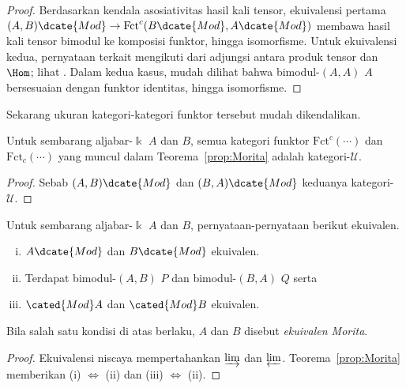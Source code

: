\begin{proof}
Berdasarkan kendala asosiativitas hasil kali tensor, ekuivalensi pertama
	$(A,B)\dcate{Mod}\to\mathrm{Fct}^c(B\dcate{Mod},A\dcate{Mod})$ membawa
hasil kali tensor bimodul ke komposisi funktor, hingga isomorfisme. Untuk
	ekuivalensi kedua, pernyataan terkait mengikuti dari adjungsi antara produk
	tensor dan $\Hom$; lihat \cite[Teorema 6.6.5]{Li1}. Dalam kedua kasus,
	mudah dilihat bahwa bimodul-$(A,A)$ $A$ bersesuaian dengan funktor identitas,
	hingga isomorfisme.
\end{proof}

Sekarang ukuran kategori-kategori funktor tersebut mudah dikendalikan.

\begin{corollary}
	Untuk sembarang aljabar-$\Bbbk$ $A$ dan $B$, semua kategori funktor
	$\mathrm{Fct}^c(\cdots)$ dan $\mathrm{Fct}_c(\cdots)$ yang muncul dalam
	Teorema~\ref{prop:Morita} adalah kategori-$\mathcal{U}$.
\end{corollary}
\begin{proof}
	Sebab $(A,B)\dcate{Mod}$ dan $(B,A)\dcate{Mod}$ keduanya kategori-
	$\mathcal{U}$.
\end{proof}

\begin{definition-proposition}\label{def:Morita-equiv}
	Untuk sembarang aljabar-$\Bbbk$ $A$ dan $B$, pernyataan-pernyataan berikut
	ekuivalen.
	\begin{enumerate}[(i)]
		\item $A\dcate{Mod}$ dan $B\dcate{Mod}$ ekuivalen.
		\item Terdapat bimodul-$(A,B)$ $P$ dan bimodul-$(B,A)$ $Q$ serta
		\item $\cated{Mod}A$ dan $\cated{Mod}B$ ekuivalen.
	\end{enumerate}
	Bila salah satu kondisi di atas berlaku, $A$ dan $B$ disebut
	\emph{ekuivalen Morita}.
\end{definition-proposition}
\begin{proof}
	Ekuivalensi niscaya mempertahankan $\varinjlim$ dan $\varprojlim$.
	Teorema~\ref{prop:Morita} memberikan (i) $\iff$ (ii) dan
	(iii) $\iff$ (ii).
\end{proof}

